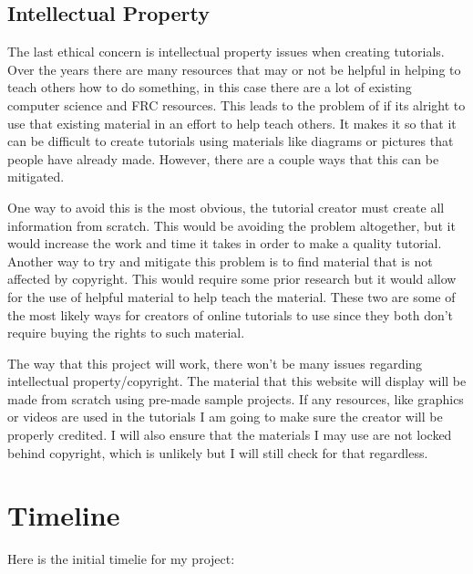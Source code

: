 \documentclass[10pt,twocolumn]{article}
\begin{document}
\subsection{Intellectual Property}
The last ethical concern is intellectual property issues when creating tutorials. Over the years there are many resources that may or not be helpful in helping to teach others how to do something, in this case there are a lot of existing computer science and FRC resources. This leads to the problem of if its alright to use that existing material in an effort to help teach others. It makes it so that it can be difficult to create tutorials using materials like diagrams or pictures that people have already made. However, there are a couple ways that this can be mitigated.

One way to avoid this is the most obvious, the tutorial creator must create all information from scratch. This would be avoiding the problem altogether, but it would increase the work and time it takes in order to make a quality tutorial. Another way to try and mitigate this problem is to find material that is not affected by copyright. This would require some prior research but it would allow for the use of helpful material to help teach the material. These two are some of the most likely ways for creators of online tutorials to use since they both don't require buying the rights to such material.

The way that this project will work, there won't be many issues regarding intellectual property/copyright. The material that this website will display will be made from scratch using pre-made sample projects. If any resources, like graphics or videos are used in the tutorials I am going to make sure the creator will be properly credited. I will also ensure that the materials I may use are not locked behind copyright, which is unlikely but I will still check for that regardless.


\section{Timeline}
Here is the initial timelie for my project: 
\end{document}
